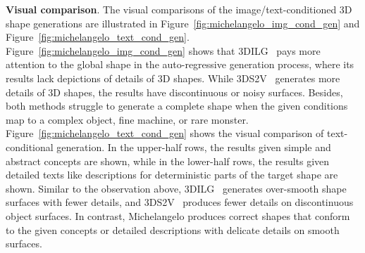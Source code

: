 \documentclass[../../book-main.tex]{subfiles}
\begin{document}
\begin{table}[th]
\caption{\textbf{Numerical results for conditional generation
comparison}. The results show that Michelangelo achieves the best
generative performance. The SI-S and ST-S indicate that the model
generates high-fidelity results by effectively mapping the condition
information to its related 3D shapes. Moreover, P-FID reflects that
the model generates the most realistic 3D shapes, and P-IS indicates
that the generated samples are diverse. $\uparrow$ means a larger
value is better, and $\downarrow$ otherwise.}
\label{tab:michelangelo_gen}
\end{table}

\textbf{Visual comparison}.
The visual comparisons of the image/text-conditioned 3D shape
generations are illustrated in
Figure~\ref{fig:michelangelo_img_cond_gen} and
Figure~\ref{fig:michelangelo_text_cond_gen}.
Figure~\ref{fig:michelangelo_img_cond_gen} shows that
3DILG~\cite{NEURIPS2022_894ca1c4} pays more attention to the global
shape in the auto-regressive generation process, where its results
lack depictions of details of 3D shapes. While
3DS2V~\cite{10.1145/3592442} generates more details of 3D shapes, the
results have discontinuous or noisy surfaces. Besides, both methods
struggle to generate a complete shape when the given conditions map
to a complex object, fine machine, or rare monster.
Figure~\ref{fig:michelangelo_text_cond_gen} shows the visual
comparison of text-conditional generation. In the upper-half rows,
the results given simple and abstract concepts are shown, while in
the lower-half rows, the results given detailed texts like
descriptions for deterministic parts of the target shape are shown.
Similar to the observation above, 3DILG~\cite{NEURIPS2022_894ca1c4}
generates over-smooth shape surfaces with fewer details, and
3DS2V~\cite{10.1145/3592442} produces fewer details on discontinuous
object surfaces. In contrast, Michelangelo produces correct shapes
that conform to the given concepts or detailed descriptions with
delicate details on smooth surfaces.
\end{document}
